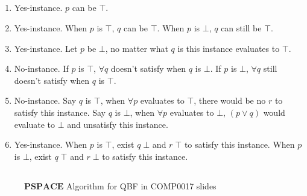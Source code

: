 \documentclass[12pt]{article}
\begin{document}
\subsection{}

\begin{enumerate}
    \item Yes-instance. $p$ can be $\top$.
    \item Yes-instance. When $p$ is $\top$, $q$ can be $\top$. When $p$ is $\bot$, $q$ can still be $\top$.
    \item Yes-instance. Let $p$ be $\bot$, no matter what $q$ is this instance evaluates to $\top$.
    \item No-instance. If $p$ is $\top$, $\forall q$ doesn't satisfy when $q$ is $\bot$. If $p$ is $\bot$, $\forall q$ still doesn't satisfy when $q$ is $\top$.
    \item No-instance. Say $q$ is $\top$, when $\forall p$ evaluates to $\top$, there would be no $r$ to satisfy this instance. Say $q$ is $\bot$, when $\forall p$ evaluates to $\bot$, $(p \lor q)$ would evaluate to $\bot$ and unsatisfy this instance.
    \item Yes-instance. When $p$ is $\top$, exist $q\; \bot$ and $r\; \top$ to satisfy this instance. When $p$ is $\bot$, exist $q \; \top$ and $r\; \bot$ to satisfy this instance.
\end{enumerate}

\subsection{}

\begin{figure}[h!]
  \caption{$\pmb{PSPACE}$ Algorithm for QBF in COMP0017 slides}
  \label{fig:QBF-PSPACE}
\end{figure}
\end{document}
